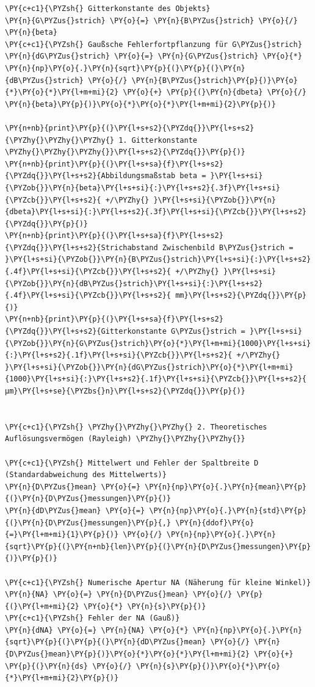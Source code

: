 \begin{tcolorbox}[breakable, size=fbox, boxrule=1pt, pad at break*=1mm,colback=cellbackground, colframe=cellborder]
\begin{Verbatim}[commandchars=\\\{\}]
\PY{c+c1}{\PYZsh{} Gitterkonstante des Objekts}
\PY{n}{G\PYZus{}strich} \PY{o}{=} \PY{n}{B\PYZus{}strich} \PY{o}{/} \PY{n}{beta}
\PY{c+c1}{\PYZsh{} Gaußsche Fehlerfortpflanzung für G\PYZus{}strich}
\PY{n}{dG\PYZus{}strich} \PY{o}{=} \PY{n}{G\PYZus{}strich} \PY{o}{*} \PY{n}{np}\PY{o}{.}\PY{n}{sqrt}\PY{p}{(}\PY{p}{(}\PY{n}{dB\PYZus{}strich} \PY{o}{/} \PY{n}{B\PYZus{}strich}\PY{p}{)}\PY{o}{*}\PY{o}{*}\PY{l+m+mi}{2} \PY{o}{+} \PY{p}{(}\PY{n}{dbeta} \PY{o}{/} \PY{n}{beta}\PY{p}{)}\PY{o}{*}\PY{o}{*}\PY{l+m+mi}{2}\PY{p}{)}

\PY{n+nb}{print}\PY{p}{(}\PY{l+s+s2}{\PYZdq{}}\PY{l+s+s2}{\PYZhy{}\PYZhy{}\PYZhy{} 1. Gitterkonstante \PYZhy{}\PYZhy{}\PYZhy{}}\PY{l+s+s2}{\PYZdq{}}\PY{p}{)}
\PY{n+nb}{print}\PY{p}{(}\PY{l+s+sa}{f}\PY{l+s+s2}{\PYZdq{}}\PY{l+s+s2}{Abbildungsmaßstab beta = }\PY{l+s+si}{\PYZob{}}\PY{n}{beta}\PY{l+s+si}{:}\PY{l+s+s2}{.3f}\PY{l+s+si}{\PYZcb{}}\PY{l+s+s2}{ +/\PYZhy{} }\PY{l+s+si}{\PYZob{}}\PY{n}{dbeta}\PY{l+s+si}{:}\PY{l+s+s2}{.3f}\PY{l+s+si}{\PYZcb{}}\PY{l+s+s2}{\PYZdq{}}\PY{p}{)}
\PY{n+nb}{print}\PY{p}{(}\PY{l+s+sa}{f}\PY{l+s+s2}{\PYZdq{}}\PY{l+s+s2}{Strichabstand Zwischenbild B\PYZus{}strich = }\PY{l+s+si}{\PYZob{}}\PY{n}{B\PYZus{}strich}\PY{l+s+si}{:}\PY{l+s+s2}{.4f}\PY{l+s+si}{\PYZcb{}}\PY{l+s+s2}{ +/\PYZhy{} }\PY{l+s+si}{\PYZob{}}\PY{n}{dB\PYZus{}strich}\PY{l+s+si}{:}\PY{l+s+s2}{.4f}\PY{l+s+si}{\PYZcb{}}\PY{l+s+s2}{ mm}\PY{l+s+s2}{\PYZdq{}}\PY{p}{)}
\PY{n+nb}{print}\PY{p}{(}\PY{l+s+sa}{f}\PY{l+s+s2}{\PYZdq{}}\PY{l+s+s2}{Gitterkonstante G\PYZus{}strich = }\PY{l+s+si}{\PYZob{}}\PY{n}{G\PYZus{}strich}\PY{o}{*}\PY{l+m+mi}{1000}\PY{l+s+si}{:}\PY{l+s+s2}{.1f}\PY{l+s+si}{\PYZcb{}}\PY{l+s+s2}{ +/\PYZhy{} }\PY{l+s+si}{\PYZob{}}\PY{n}{dG\PYZus{}strich}\PY{o}{*}\PY{l+m+mi}{1000}\PY{l+s+si}{:}\PY{l+s+s2}{.1f}\PY{l+s+si}{\PYZcb{}}\PY{l+s+s2}{ µm}\PY{l+s+se}{\PYZbs{}n}\PY{l+s+s2}{\PYZdq{}}\PY{p}{)}


\PY{c+c1}{\PYZsh{} \PYZhy{}\PYZhy{}\PYZhy{} 2. Theoretisches Auflösungsvermögen (Rayleigh) \PYZhy{}\PYZhy{}\PYZhy{}}

\PY{c+c1}{\PYZsh{} Mittelwert und Fehler der Spaltbreite D (Standardabweichung des Mittelwerts)}
\PY{n}{D\PYZus{}mean} \PY{o}{=} \PY{n}{np}\PY{o}{.}\PY{n}{mean}\PY{p}{(}\PY{n}{D\PYZus{}messungen}\PY{p}{)}
\PY{n}{dD\PYZus{}mean} \PY{o}{=} \PY{n}{np}\PY{o}{.}\PY{n}{std}\PY{p}{(}\PY{n}{D\PYZus{}messungen}\PY{p}{,} \PY{n}{ddof}\PY{o}{=}\PY{l+m+mi}{1}\PY{p}{)} \PY{o}{/} \PY{n}{np}\PY{o}{.}\PY{n}{sqrt}\PY{p}{(}\PY{n+nb}{len}\PY{p}{(}\PY{n}{D\PYZus{}messungen}\PY{p}{)}\PY{p}{)}

\PY{c+c1}{\PYZsh{} Numerische Apertur NA (Näherung für kleine Winkel)}
\PY{n}{NA} \PY{o}{=} \PY{n}{D\PYZus{}mean} \PY{o}{/} \PY{p}{(}\PY{l+m+mi}{2} \PY{o}{*} \PY{n}{s}\PY{p}{)}
\PY{c+c1}{\PYZsh{} Fehler der NA (Gauß)}
\PY{n}{dNA} \PY{o}{=} \PY{n}{NA} \PY{o}{*} \PY{n}{np}\PY{o}{.}\PY{n}{sqrt}\PY{p}{(}\PY{p}{(}\PY{n}{dD\PYZus{}mean} \PY{o}{/} \PY{n}{D\PYZus{}mean}\PY{p}{)}\PY{o}{*}\PY{o}{*}\PY{l+m+mi}{2} \PY{o}{+} \PY{p}{(}\PY{n}{ds} \PY{o}{/} \PY{n}{s}\PY{p}{)}\PY{o}{*}\PY{o}{*}\PY{l+m+mi}{2}\PY{p}{)}


\end{Verbatim}
\end{tcolorbox}
